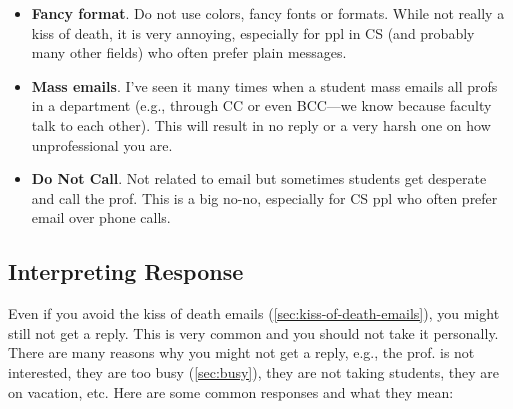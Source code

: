 \documentclass[oneside,11pt,dvipsnames]{book}
\begin{document}
\begin{itemize}
    \item \textbf{Fancy format}.  Do not use colors, fancy fonts or formats. While not really a kiss of death, it is very annoying, especially for ppl in CS (and probably many other fields) who often prefer plain messages.
    
    \item \textbf{Mass emails}. I've seen it many times when a student mass emails all profs in a department (e.g., through CC or even BCC---we know because faculty talk to each other).  This will result in no reply or a very harsh one on how unprofessional you are.
    
    \item \textbf{Do Not Call}. Not related to email but sometimes students get desperate and call the prof.  This is a big no-no, especially for CS ppl who often prefer email over phone calls. 
\end{itemize}

\subsection{Interpreting Response}\label{sec:interpreting-response}
Even if you avoid the kiss of death emails (\autoref{sec:kiss-of-death-emails}), you might still not get a reply.  This is very common and you should not take it personally.  There are many reasons why you might not get a reply, e.g., the prof. is not interested, they are too busy (\autoref{sec:busy}), they are not taking students, they are on vacation, etc.  Here are some common responses and what they mean:
\end{document}
